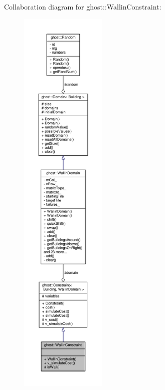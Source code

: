 Collaboration diagram for ghost\-:\-:Wallin\-Constraint\-:
\nopagebreak
\begin{figure}[H]
\begin{center}
\leavevmode
\includegraphics[height=550pt]{classghost_1_1WallinConstraint__coll__graph}
\end{center}
\end{figure}
